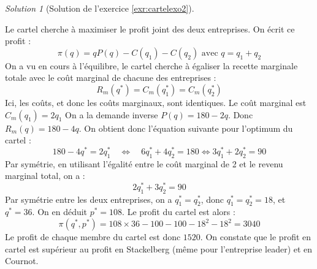 \documentclass[
]{book}
\theoremstyle{definition}
\theoremstyle{definition}
\theoremstyle{definition}
\theoremstyle{definition}
\theoremstyle{remark}
\newtheorem*{solution}{Solution}
\begin{document}
\begin{solution}[Solution de l'exercice \ref{exr:cartelexo2}]
\begin{enumerate}
  Le cartel cherche à maximiser le profit joint des deux entreprises.
  On écrit ce profit :
  \[\pi(q)=qP(q)-C(q_1)-C(q_2)\text{ avec }q=q_1+q_2\]
  On a vu en cours à l'équilibre, le cartel cherche à égaliser la recette marginale totale avec le coût marginal de chacune des entreprises :
  \[R_m(q^*)=C_m(q_1^*)=C_{m}(q_2^*)\]
  Ici, les coûts, et donc les coûts marginaux, sont identiques.
  Le coût marginal est \(C_m(q_1)=2q_1\)
  On a la demande inverse \(P(q)=180-2q\).
  Donc \(R_m(q)=180-4q\).
  On obtient donc l'équation suivante pour l'optimum du cartel :
  \[180-4q^*=2q_1^*\quad\Leftrightarrow\quad 6q_1^*+4q_2^*=180\Leftrightarrow 3q_1^*+2q_2^*=90\]
  Par symétrie, en utilisant l'égalité entre le coût marginal de 2 et le revenu marginal total, on a :
  \[2q_1^*+3q_2^*=90\]
  Par symétrie entre les deux entreprises, on a \(q_1^*=q_2^*\), donc \(q_1^*=q_2^*=18\), et \(q^*=36\).
  On en déduit \(p^*=108\).
  Le profit du cartel est alors :
  \[\pi(q^*, p^*)=108\times36-100-100-18^2-18^2=3040\]
  Le profit de chaque membre du cartel est donc \(1520\).
  On constate que le profit en cartel est supérieur au profit en Stackelberg (même pour l'entreprise leader) et en Cournot.
\end{enumerate}

\end{solution}
\end{document}
